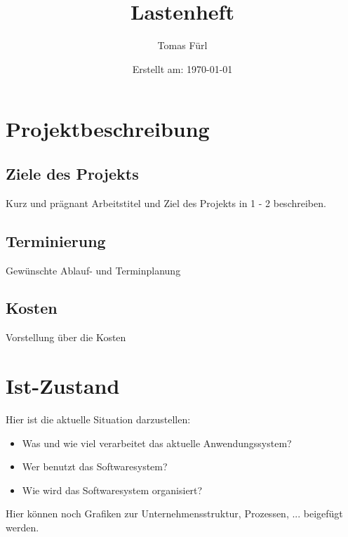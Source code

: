 \documentclass[a4paper, 12pt]{article}
\title{Lastenheft \Projektname}
\date{Erstellt am: \today}
\author{Tomas Fürl}
\begin{document}
    \maketitle
    \newpage

    \section{Projektbeschreibung}
    \subsection{Ziele des Projekts}
    Kurz und prägnant Arbeitstitel und Ziel des Projekts in 1 - 2 beschreiben.
    \subsection{Terminierung}
    Gewünschte Ablauf- und Terminplanung
    \subsection{Kosten}
    Vorstellung über die Kosten

    \section{Ist-Zustand}
    Hier ist die aktuelle Situation darzustellen:
    \begin{itemize}
        \item Was und wie viel verarbeitet das aktuelle Anwendungssystem?
        \item Wer benutzt das Softwaresystem?
        \item Wie wird das Softwaresystem organisiert?
    \end{itemize}
    Hier können noch Grafiken zur Unternehmensstruktur, Prozessen, ... beigefügt werden.
\end{document}
